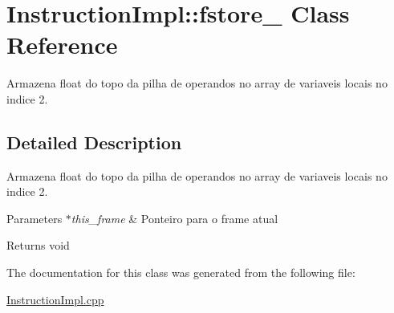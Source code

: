 \hypertarget{class_instruction_impl_1_1fstore__2}{}\section{Instruction\+Impl\+:\+:fstore\+\_ Class Reference}
\label{class_instruction_impl_1_1fstore__2}


Armazena float do topo da pilha de operandos no array de variaveis locais no indice 2.  




\subsection{Detailed Description}
Armazena float do topo da pilha de operandos no array de variaveis locais no indice 2. 


\begin{DoxyParams}{Parameters}
{\em $\ast$this\+\_\+frame} & Ponteiro para o frame atual \\
\hline
\end{DoxyParams}
\begin{DoxyReturn}{Returns}
void 
\end{DoxyReturn}


The documentation for this class was generated from the following file\+:\begin{DoxyCompactItemize}
\item 
\hyperlink{_instruction_impl_8cpp}{Instruction\+Impl.\+cpp}\end{DoxyCompactItemize}
